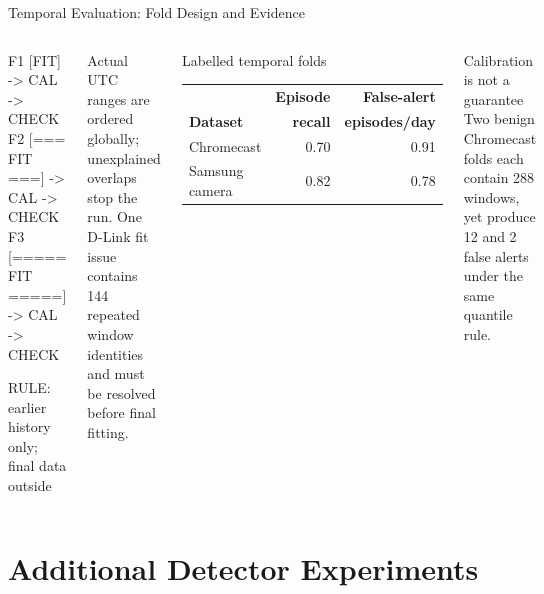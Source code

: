\documentclass[aspectratio=169,10pt]{beamer}
\begin{document}
\begin{frame}[fragile]{Temporal Evaluation: Fold Design and Evidence}
\begin{columns}[T,onlytextwidth]
\begin{asciiart}
F1 [FIT] -> CAL -> CHECK
F2 [=== FIT ===] -> CAL -> CHECK
F3 [===== FIT =====] -> CAL -> CHECK

RULE: earlier history only; final data outside
\end{asciiart}

\vspace{0.28cm}
\small Actual UTC ranges are ordered globally; unexplained overlaps stop the
run. One D-Link fit issue contains 144 repeated window identities and must be
resolved before final fitting.

\begin{block}{Labelled temporal folds}
\small
\begin{tabular}{@{}lrr@{}}
\toprule
& \textbf{Episode} & \textbf{False-alert}\\
\textbf{Dataset} & \textbf{recall} & \textbf{episodes/day}\\
\midrule
Chromecast & 0.70 & 0.91\\
Samsung camera & 0.82 & 0.78\\
\bottomrule
\end{tabular}
\end{block}

\begin{alertblock}{Calibration is not a guarantee}
Two benign Chromecast folds each contain 288 windows, yet produce 12 and 2 false
alerts under the same quantile rule.
\end{alertblock}
\end{columns}
\end{frame}

\section{Additional Detector Experiments}
\end{document}
